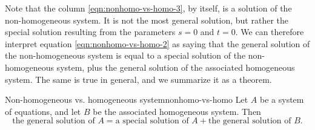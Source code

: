 Note that the column {\eqref{eqn:nonhomo-vs-homo-3}}, by itself, is a
solution of the non-homogeneous system. It is not the most general
solution, but rather the special solution resulting from the
parameters $s=0$ and $t=0$. We can therefore interpret equation
{\eqref{eqn:nonhomo-vs-homo-2}} as saying that the general solution of
the non-homogeneous system is equal to a special solution of the
non-homogeneous system, plus the general solution of the associated
homogeneous system. The same is true in general, and we summarize it
as a theorem.

\begin{theorem}{Non-homogeneous vs. homogeneous system}{nonhomo-vs-homo}
  Let $A$ be a system of equations, and let $B$ be the associated
  homogeneous system. Then
  \begin{equation*}
    \mbox{the general solution of $A$}
    = \mbox{a special solution of $A$}
    + \mbox{the general solution of $B$}.
  \end{equation*}
\end{theorem}

